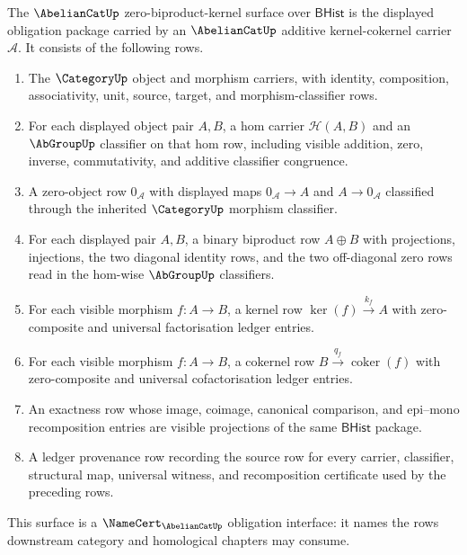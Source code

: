 \begin{definition}
\label{def:abeliancat-zero-biproduct-kernel-surface}
The $\AbelianCatUp$ zero-biproduct-kernel surface over $\mathsf{BHist}$ is the
displayed obligation package carried by an
$\AbelianCatUp$ additive kernel-cokernel carrier $\mathcal A$. It consists of
the following rows.
\begin{enumerate}
  \item The $\CategoryUp$ object and morphism carriers, with identity,
  composition, associativity, unit, source, target, and morphism-classifier
  rows.
  \item For each displayed object pair $A,B$, a hom carrier
  $\mathcal H(A,B)$ and an $\AbGroupUp$ classifier on that hom row, including
  visible addition, zero, inverse, commutativity, and additive classifier
  congruence.
  \item A zero-object row $0_{\mathcal A}$ with displayed maps
  $0_{\mathcal A}\to A$ and $A\to 0_{\mathcal A}$ classified through the
  inherited $\CategoryUp$ morphism classifier.
  \item For each displayed pair $A,B$, a binary biproduct row
  $A\oplus B$ with projections, injections, the two diagonal identity rows,
  and the two off-diagonal zero rows read in the hom-wise $\AbGroupUp$
  classifiers.
  \item For each visible morphism $f:A\to B$, a kernel row
  $\ker(f)\xrightarrow{k_f}A$ with zero-composite and universal
  factorisation ledger entries.
  \item For each visible morphism $f:A\to B$, a cokernel row
  $B\xrightarrow{q_f}\operatorname{coker}(f)$ with zero-composite and
  universal cofactorisation ledger entries.
  \item An exactness row whose image, coimage, canonical comparison, and
  epi--mono recomposition entries are visible projections of the same
  $\mathsf{BHist}$ package.
  \item A ledger provenance row recording the source row for every carrier,
  classifier, structural map, universal witness, and recomposition certificate
  used by the preceding rows.
\end{enumerate}
This surface is a $\NameCert_{\AbelianCatUp}$ obligation interface: it names
the rows downstream category and homological chapters may consume.
\end{definition}


